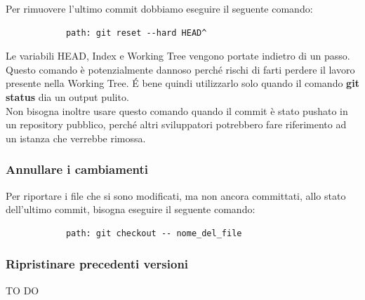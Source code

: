 		Per rimuovere l'ultimo commit dobbiamo eseguire il seguente comando:
			\begin{verbatim}
			path: git reset --hard HEAD^
			\end{verbatim}
		\noindent
		Le variabili HEAD, Index e Working Tree vengono portate indietro di un passo. \\
		Questo comando è potenzialmente dannoso perché rischi di farti perdere il lavoro presente nella Working Tree. \'E bene quindi utilizzarlo solo quando il comando \textbf{git status} dia un output pulito. \\
		Non bisogna inoltre usare questo comando quando il commit è stato pushato in un repository pubblico, perché altri sviluppatori potrebbero fare riferimento ad un istanza che verrebbe rimossa.
		
		
		\subsubsection{Annullare i cambiamenti} %
		\label{ssub:annullare_i_cambiamenti}
		Per riportare i file che si sono modificati, ma non ancora committati, allo stato dell'ultimo commit, bisogna eseguire il seguente comando:
			\begin{verbatim}
			path: git checkout -- nome_del_file
			\end{verbatim}

		\subsubsection{Ripristinare precedenti versioni} %
		\label{ssub:ripristinare_precedenti_versioni}
		TO DO


